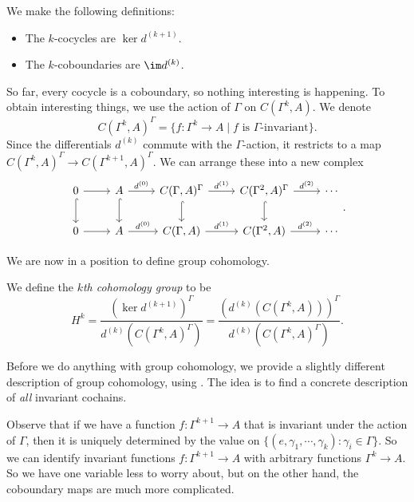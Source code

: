 \documentclass[a4paper]{article}
\begin{document}
We make the following definitions:
\begin{defi}\leavevmode
  \begin{itemize}
    \item The $k$-cocycles are $\ker d^{(k + 1)}$.
    \item The $k$-coboundaries are $\im d^{(k)}$.
  \end{itemize}
\end{defi}
So far, every cocycle is a coboundary, so nothing interesting is happening. To obtain interesting things, we use the action of $\Gamma$ on $C(\Gamma^k, A)$. We denote
\[
  C(\Gamma^k, A)^\Gamma = \{f\colon \Gamma^k \to A \mid f \text{ is $\Gamma$-invariant}\}.
\]
Since the differentials $d^{(k)}$ commute with the $\Gamma$-action, it restricts to a map $C(\Gamma^k, A)^\Gamma \to C(\Gamma^{k + 1}, A)^\Gamma$. We can arrange these into a new complex
\[
  \begin{tikzcd}
    0 \ar[r] \ar[d, hook] & A \ar[r, "d^{(0)}"] \ar[d, hook] & C(\Gamma, A)^\Gamma \ar[r, "d^{(1)}"] \ar[d, hook] & C(\Gamma^2, A)^\Gamma \ar[r, "d^{(2)}"]\ar[d, hook] & \cdots\\
    0 \ar[r] & A \ar[r, "d^{(0)}"] & C(\Gamma, A) \ar[r, "d^{(1)}"] & C(\Gamma^2, A) \ar[r, "d^{(2)}"] & \cdots
  \end{tikzcd}.
\]

We are now in a position to define group cohomology.
\begin{defi}
  We define the \emph{$k$th cohomology group} to be
  \[
    H^k = \frac{(\ker d^{(k + 1)})^\Gamma}{d^{(k)} (C(\Gamma^k, A)^\Gamma)} = \frac{(d^{(k)} (C(\Gamma^k, A)))^\Gamma}{d^{(k)} (C(\Gamma^k, A)^\Gamma)}.
  \]
\end{defi}

Before we do anything with group cohomology, we provide a slightly different description of group cohomology, using . The idea is to find a concrete description of \emph{all} invariant cochains.

Observe that if we have a function $f\colon \Gamma^{k + 1} \to A$ that is invariant under the action of $\Gamma$, then it is uniquely determined by the value on $\{(e, \gamma_1, \cdots, \gamma_k): \gamma_i \in \Gamma\}$. So we can identify invariant functions $f\colon \Gamma^{k + 1} \to A$ with arbitrary functions $\Gamma^k \to A$. So we have one variable less to worry about, but on the other hand, the coboundary maps are much more complicated.
\end{document}
